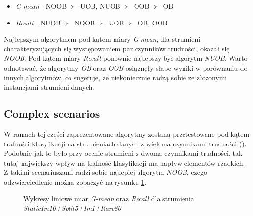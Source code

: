 \begin{itemize}
    \item \textit{G-mean} - NOOB $\succ$ UOB, NUOB $\succ$ OOB $\succ$ OB
    \item \textit{Recall} - NUOB $\succ$ NOOB $\succ$ UOB $\succ$ OB, OOB
\end{itemize}

\noindent Najlepszym algorytmem pod kątem miary \textit{G-mean}, dla strumieni charakteryzujących się występowaniem par czynników trudności, okazał się \textit{NOOB}. Pod kątem miary \textit{Recall} ponownie najlepszy był algorytm \textit{NUOB}. Warto odnotować, że algorytmy \textit{OB} oraz \textit{OOB} osiągnęły słabe wyniki w porównaniu do innych algorytmów, co sugeruje, że niekoniecznie radzą sobie ze złożonymi instancjami strumieni danych.

\subsection{Complex scenarios}

\noindent W ramach tej części zaprezentowane algorytmy zostaną przetestowane pod kątem trafności klasyfikacji na strumieniach danych z wieloma czynnikami trudności (). Podobnie jak to było przy ocenie strumieni z dwoma czynnikami trudności, tak tutaj największy wpływ na trafność klasyfikacji ma napływ elementów rzadkich. Z takimi scenariuszami radzi sobie najlepiej algorytm \textit{NOOB}, czego odzwierciedlenie można zobaczyć na rysunku \ref{Figure:ComlexScenario}.

\newpage

\begin{figure}[h]
    \centering
    \qquad
    \caption{Wykresy liniowe miar \textit{G-mean} oraz \textit{Recall} dla strumienia \textit{StaticIm10+Split5+Im1+Rare80}}\label{Figure:ComlexScenario}
\end{figure}

